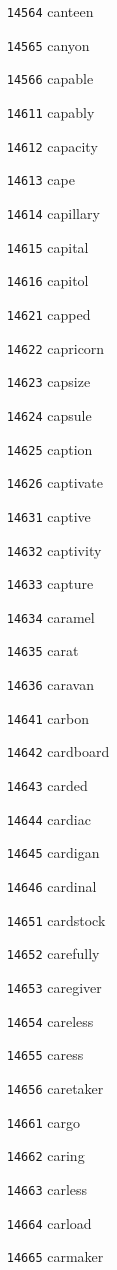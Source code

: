 \documentclass[twoside,11pt]{article}
\begin{document}
\begin{multicols}{5}
\begin{enumerate}
\item[\texttt{14564}] canteen
\item[\texttt{14565}] canyon
\item[\texttt{14566}] capable
\item[\texttt{14611}] capably
\item[\texttt{14612}] capacity
\item[\texttt{14613}] cape
\item[\texttt{14614}] capillary
\item[\texttt{14615}] capital
\item[\texttt{14616}] capitol
\item[\texttt{14621}] capped
\item[\texttt{14622}] capricorn
\item[\texttt{14623}] capsize
\item[\texttt{14624}] capsule
\item[\texttt{14625}] caption
\item[\texttt{14626}] captivate
\item[\texttt{14631}] captive
\item[\texttt{14632}] captivity
\item[\texttt{14633}] capture
\item[\texttt{14634}] caramel
\item[\texttt{14635}] carat
\item[\texttt{14636}] caravan
\item[\texttt{14641}] carbon
\item[\texttt{14642}] cardboard
\item[\texttt{14643}] carded
\item[\texttt{14644}] cardiac
\item[\texttt{14645}] cardigan
\item[\texttt{14646}] cardinal
\item[\texttt{14651}] cardstock
\item[\texttt{14652}] carefully
\item[\texttt{14653}] caregiver
\item[\texttt{14654}] careless
\item[\texttt{14655}] caress
\item[\texttt{14656}] caretaker
\item[\texttt{14661}] cargo
\item[\texttt{14662}] caring
\item[\texttt{14663}] carless
\item[\texttt{14664}] carload
\item[\texttt{14665}] carmaker

\end{enumerate}
\end{multicols}
\end{document}

